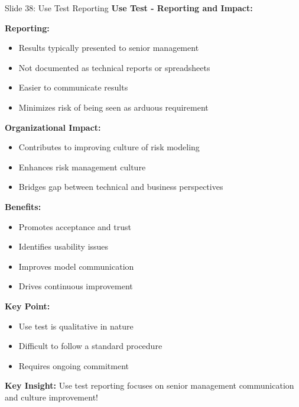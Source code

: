 \documentclass[8pt]{beamer}
\begin{document}
	\begin{frame}{Slide 38: Use Test Reporting}
		\fontsize{6.5}{7.5}\selectfont
		\textbf{Use Test - Reporting and Impact:}
		
		\vspace{0.1cm}
		\textbf{Reporting:}
		\begin{itemize}
			\item Results typically presented to senior management
			\item Not documented as technical reports or spreadsheets
			\item Easier to communicate results
			\item Minimizes risk of being seen as arduous requirement
		\end{itemize}
		
		\vspace{0.1cm}
		\textbf{Organizational Impact:}
		\begin{itemize}
			\item Contributes to improving culture of risk modeling
			\item Enhances risk management culture
			\item Bridges gap between technical and business perspectives
		\end{itemize}
		
		\vspace{0.1cm}
		\textbf{Benefits:}
		\begin{itemize}
			\item Promotes acceptance and trust
			\item Identifies usability issues
			\item Improves model communication
			\item Drives continuous improvement
		\end{itemize}
		
		\vspace{0.1cm}
		\textbf{Key Point:}
		\begin{itemize}
			\item Use test is qualitative in nature
			\item Difficult to follow a standard procedure
			\item Requires ongoing commitment
		\end{itemize}
		
		\textcolor{myblue}{\textbf{Key Insight:}} Use test reporting focuses on \textcolor{myblue}{senior management communication and culture improvement}!
	\end{frame}
	
\end{document}
